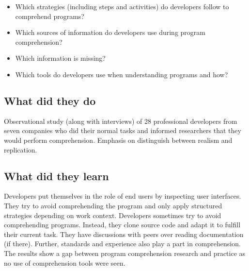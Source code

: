 \begin{itemize}
    \item Which strategies (including steps and activities) do developers follow to comprehend programs?
    \item Which sources of information do developers use during program comprehension?
    \item Which information is missing?
    \item Which tools do developers use when understanding programs and how?
\end{itemize}

\subsection{What did they do}

Observational study (along with interviews) of 28 professional developers from seven companies who did their normal tasks and informed researchers that they would perform comprehension. Emphasis on distinguish between realism and replication.

\subsection{What did they learn}

Developers put themselves in the role of end users by inspecting user interfaces. They try to avoid comprehending the program and only apply structured strategies depending on work context. Developers sometimes try to avoid comprehending programs. Instead, they clone source code and adapt it to fulfill their current task. They have discussions with peers over reading documentation (if there). Further, standards and experience also play a part in comprehension. The results show a gap between program comprehension research and practice as no use of comprehension tools were seen.

